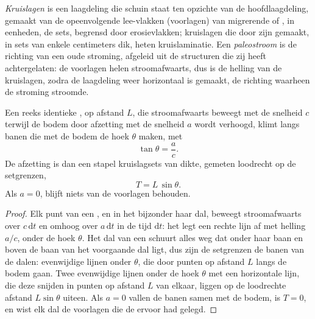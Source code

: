 \begin{definition}\label{def:b1:clastic-sediments:cross-bedding}
\emph{Kruislagen} is een laagdeling die schuin staat ten opzichte van de hoofdlaagdeling, gemaakt van de opeenvolgende lee-vlakken (voorlagen) van migrerende  of , in eenheden, de sets, begrensd door erosievlakken; kruislagen die door  zijn gemaakt, in sets van enkele centimeters dik, heten kruislaminatie. Een \emph{paleostroom} is de richting van een oude stroming, afgeleid uit de structuren die zij heeft achtergelaten: de voorlagen helen stroomafwaarts, dus is de helling van de kruislagen, zodra de laagdeling weer horizontaal is gemaakt, de richting waarheen de stroming stroomde.
\end{definition}

\begin{proposition}\label{prop:b1:clastic-sediments:climb}
Een reeks identieke , op afstand $L$, die stroomafwaarts beweegt met de snelheid $c$ terwijl de bodem door afzetting met de snelheid $a$ wordt verhoogd, klimt langs banen die met de bodem de hoek $\theta$ maken, met
\[
  \tan\theta = \frac{a}{c}.
\]
De afzetting is dan een stapel kruislagsets van dikte, gemeten loodrecht op de setgrenzen,
\[
  T = L\,\sin\theta .
\]
Als $a = 0$, blijft niets van de voorlagen behouden.
\end{proposition}

\begin{proof}
Elk punt van een , en in het bijzonder haar dal, beweegt stroomafwaarts over $c\,\mathrm dt$ en omhoog over $a\,\mathrm dt$ in de tijd $\mathrm dt$: het legt een rechte lijn af met helling $a/c$, onder de hoek $\theta$. Het dal van een  schuurt alles weg dat onder haar baan en boven de baan van het voorgaande dal ligt, dus zijn de setgrenzen de banen van de dalen: evenwijdige lijnen onder $\theta$, die door punten op afstand $L$ langs de bodem gaan. Twee evenwijdige lijnen onder de hoek $\theta$ met een horizontale lijn, die deze snijden in punten op afstand $L$ van elkaar, liggen op de loodrechte afstand $L\sin\theta$ uiteen. Als $a = 0$ vallen de banen samen met de bodem, is $T = 0$, en wist elk dal de voorlagen die de  ervoor had gelegd.
\end{proof}

